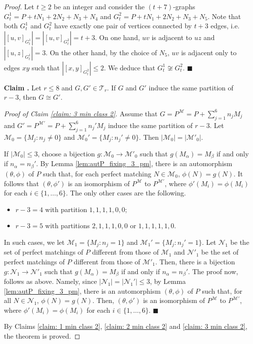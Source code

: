 \documentclass[a4paper,11pt]{article}
\newcommand{\ca}{\mathcal}
\newcounter{claimcount}
\newenvironment{claim}{\refstepcounter{claimcount}\textbf{Claim \arabic{claimcount}.}}{}
\theoremstyle{remark}
\newcommand{\ENDproof}{\hfill $\blacksquare$\medskip\par}
\begin{document}
\begin{proof}
Let $t\ge2$ be an integer and consider the $(t+7)$-graphs $G_t^1 = P + tN_1 + 2N_2 + N_3 + N_4$ and $G_t^2 = P + tN_1 + 2N_2 + N_3 + N_5$. Note that both $G_t^1$ and $G_t^2$ have exactly one pair of vertices connected by $ t+3 $ edges, i.e.\ $ |[u,v]_{G^1_t} |=|[u,v]_{G^2_t}|=t+3$.
 On one hand, $uv$ is adjacent to $uz$ and $|[u,z]_{G^1_t}|=3$. On the other hand, by the choice of $N_5$, $uv$ is adjacent only to edges $xy$ such that $|[x,y]_{G_t^2}|\le 2$. We deduce that $G_t^1 \not\cong G_t^2.$
\ENDproof







\begin{claim}\label{claim: 3 min class 2}
	Let $r \leq 8$ and
	$G, G' \in \ca T_r$. If $G$ and $G'$ induce the same partition of $r-3$,
	then $G \cong G'$.
\end{claim}

\emph{Proof of Claim \ref{claim: 3 min class 2}.} 
Assume that $ G = P^{\ca M}= P + \sum_{j=1}^6 n_j M_j$ and 
$G'=P^{\ca M'} = P + \sum_{j=1}^6 n_j' M_j$ induce the same partition of $r-3$. Let $\ca M_0 = \{M_j \colon n_j\ne0\}$ and $\ca M_0' = \{M_j \colon n_j'\ne0\}$. Then $|\ca M_0 |= |\ca M'_0| $.

If $|\ca M_0|\le 3$, choose a bijection $g\colon \ca M_0 \to \ca M'_0$ such that $g(M_{\alpha})=M_{\beta}$ if and only if $n_{\alpha} = n_{\beta}'$. By Lemma \ref{lem:autP_fixing_3_pm}, there is an automorphism $(\theta,\phi)$ of $P$ such that, for each perfect matching $N\in\ca M_0$, $\phi(N) = g(N)$. It follows that $(\theta,\phi')$ is an isomorphism of $P^{\ca M}$ to $P^{\ca M'}$, where $ \phi'(M_i)=\phi(M_i) $  for each $ i\in\{1,\ldots,6\} $.
The only other cases are the following.
\begin{itemize}
	\item $r-3 =4$ with partition $1,1,1,1,0,0$;
	\item $r-3 =5$ with partitions $2,1,1,1,0,0$ or $1,1,1,1,1,0.$
\end{itemize}
In such cases, we let $\ca M_1 = \{M_j \colon n_j=1\}$ and $\ca M_1' = \{M_j \colon n_j'=1\}$. Let $\ca N_1$ be the set of perfect matchings of $P$ different from those of $ \ca M_1$ and $\ca N'_1$ be the set of perfect matchings of $P$ different from those of $\ca M'_1$. Then, there is a bijection $g\colon \ca N_1 \to \ca N'_1$ such that $g(M_{\alpha})=M_{\beta}$ if and only if $n_{\alpha} = n_{\beta}'$. The proof now, follows as above. Namely, since $|\ca N_1|=|\ca N_1'|\le3 $, by Lemma \ref{lem:autP_fixing_3_pm}, there is an automorphism $(\theta,\phi)$ of $P$ such that, for all $N\in\ca N_1$, $\phi(N) = g(N)$. Then, $(\theta,\phi')$ is an isomorphism of $P^{\ca M}$ to $P^{\ca M'}$, where $ \phi'(M_i)=\phi(M_i) $ for each $ i\in\{1,\ldots,6\} $.
\ENDproof

By Claims \ref{claim: 1 min class 2}, \ref{claim: 2 min class 2} and \ref{claim: 3 min class 2}, the theorem is proved.
\end{proof}
\end{document}
